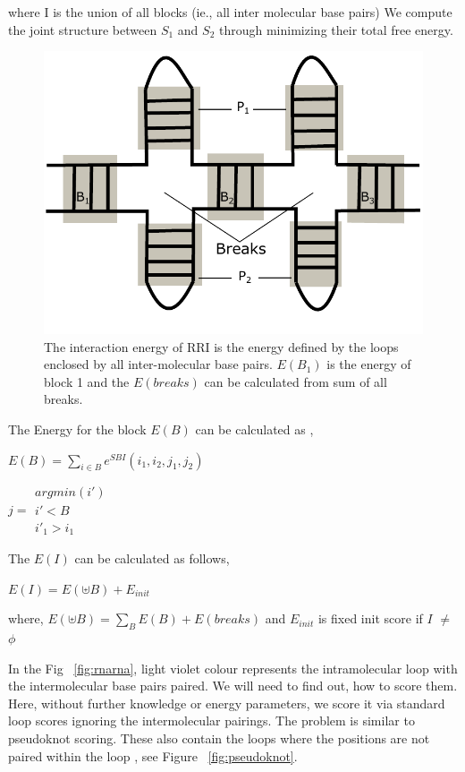 \documentclass[twoside,a4paper]{report}
\begin{document}
 	where I is the union of all blocks (ie., all inter molecular base pairs)
 	We compute the joint structure between $S_1$ and $S_2$ through minimizing their total free energy. 
	
	\begin{figure}[tb]
		\includegraphics[width=0.5\linewidth]{break.pdf}
		\centering
		\caption{The interaction energy of RRI is the energy defined by the loops enclosed by all inter-molecular base pairs. $E(B_1)$ is the energy of block 1 and the $E(breaks)$ can be calculated from sum of all breaks.  }
		\label{fig:break}
	\end{figure}

		
	 The Energy for the block $E(B)$ can be calculated as  ,
	
	\begin{center}
	
	$E(B) =  \sum_{i \in B }e^{SBI}(i_1,i_2,j_1,j_2)$
	
		\end{center}
	
	\begin{center}
	$ j = \substack{argmin(i') \\ i' < B \\ i'_1 > i_1}$ 
		\end{center}
	
	
		The $E(I)$ can be calculated as follows,
	
	\begin{center}
		$E(I) = E(  \uplus  B) + E_{init} $
	\end{center}
	\begin{center}
		where, $E(  \uplus  B) = \sum_B E(B) + E(breaks)$ and $E_{init}$ is fixed init score if $I$ $\neq$ $\phi$ 
	\end{center}

	In the Fig ~\ref{fig:rnarna}, light violet colour represents the intramolecular loop with the intermolecular base pairs paired. We will need to find out, how to score them. Here, without further knowledge or energy parameters, we score it via standard loop scores ignoring the intermolecular pairings. The problem is similar to pseudoknot scoring. These also contain  the loops where the positions are not paired within the loop , see Figure ~\ref{fig:pseudoknot}.\\
\end{document}
